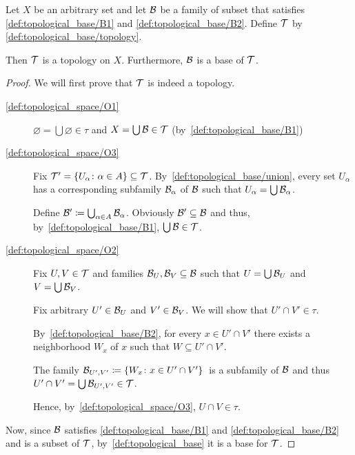\begin{proposition}
  Let $X$ be an arbitrary set and let $\mathcal B$ be a family of subset that satisfies \ref{def:topological_base/B1} and \ref{def:topological_base/B2}. Define $\mathcal T$ by \cref{def:topological_base/topology}.

  Then $\mathcal T$ is a topology on $X$. Furthermore, $\mathcal B$ is a base of $\mathcal T$.
\end{proposition}
\begin{proof}
  We will first prove that $\mathcal T$ is indeed a topology.

  \begin{description}
    \item[\ref{def:topological_space/O1}] $\varnothing = \bigcup \varnothing \in \tau$ and $X = \bigcup \mathcal B \in \mathcal T$ (by~\ref{def:topological_base/B1})

    \item[\ref{def:topological_space/O3}] Fix $\mathcal T' = \{ U_\alpha \colon \alpha \in A \} \subseteq \mathcal T$. By~\cref{def:topological_base/union}, every set $U_\alpha$ has a corresponding subfamily $\mathcal B_\alpha$ of $\mathcal B$ such that $U_\alpha = \bigcup \mathcal B_\alpha$.

    Define $\mathcal B' \coloneqq \bigcup_{\alpha \in A} \mathcal B_\alpha$. Obviously $\mathcal B' \subseteq \mathcal B$ and thus, by~\ref{def:topological_base/B1}, $\bigcup \mathcal B \in \mathcal T$.

    \item[\ref{def:topological_space/O2}] Fix $U, V \in \mathcal T$ and families $\mathcal B_U, \mathcal B_V \subseteq \mathcal B$ such that $U = \bigcup \mathcal B_U$ and $V = \bigcup \mathcal B_V$.

    Fix arbitrary $U' \in \mathcal B_U$ and $V' \in \mathcal B_V$. We will show that $U' \cap V' \in \tau$.

    By~\ref{def:topological_base/B2}, for every $x \in U' \cap V'$ there exists a neighborhood $W_x$ of $x$ such that $W \subseteq U' \cap V'$.

    The family $\mathcal B_{U',V'} \coloneqq \{ W_x \colon x \in U' \cap V' \}$~\AOC is a subfamily of $\mathcal B$ and thus $U' \cap V' = \bigcup \mathcal B_{U',V'} \in \mathcal T$.

    Hence, by~\ref{def:topological_space/O3}, $U \cap V \in \tau$.
  \end{description}

  Now, since $\mathcal B$ satisfies \ref{def:topological_base/B1} and \ref{def:topological_base/B2} and is a subset of $\mathcal T$, by~\cref{def:topological_base} it is a base for $\mathcal T$.
\end{proof}

